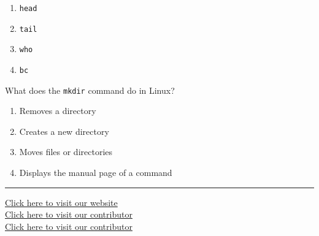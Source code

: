 \documentclass[11pt,a4paper]{article}
\begin{document}
\begin{parts}
\begin{enumerate}[label=(\alph*),itemsep=2pt]
    \item   \texttt{head}
    \item   \texttt{tail}
    \item   \texttt{who}
    \item   \texttt{bc}
  \end{enumerate}
  
  \item What does the   \texttt{mkdir} command do in Linux?
  
\begin{enumerate}[label=(\alph*),itemsep=2pt]
    \item Removes a directory
    \item Creates a new directory
    \item Moves files or directories
    \item Displays the manual page of a command
  \end{enumerate}
\end{parts}

\vfill
\rule{\linewidth}{0.4pt}

\begin{center}\small
\href{https://bhu-exam.vercel.app/}{Click here to visit our website}\\[4pt]\href{https://me-aryan.vercel.app/}{Click here to visit our contributor}\\[4pt]\href{https://quashan-me.vercel.app/}{Click here to visit our contributor}
\end{center}
\end{document}
